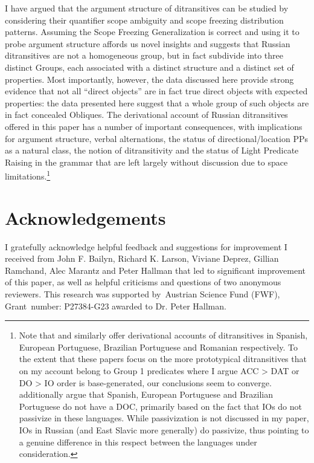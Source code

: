 \documentclass[output=paper,colorlinks,citecolor=brown,nonflat]{./langscibook}
\begin{document}
I have argued that the argument structure of ditransitives can be studied by considering their quantifier scope ambiguity and scope freezing distribution patterns. Assuming the Scope Freezing Generalization is correct and using it to probe argument structure affords us novel insights and suggests that Russian ditransitives are not a homogeneous group, but in fact subdivide into three distinct Groups, each associated with a distinct structure and a distinct set of properties. Most importantly, however, the data discussed here provide strong evidence that not all “direct objects” are in fact true direct objects with expected properties: the data presented here suggest that a whole group of such objects are in fact concealed Obliques. The derivational account of Russian ditransitives offered in this paper has a number of important consequences, with implications for argument structure, verbal alternations, the status of directional/location PPs as a natural class, the notion of ditransitivity and the status of Light Predicate Raising in the grammar that are left largely without discussion due to space limitations.\footnote{Note that  and  similarly offer derivational accounts of ditransitives in Spanish, European Portuguese, Brazilian Portuguese and Romanian respectively. To the extent that these papers focus on the more prototypical ditransitives that on my account belong to Group 1 predicates where I argue ACC > DAT or DO > IO order is base-generated, our conclusions seem to converge.  additionally argue that Spanish, European Portuguese and Brazilian Portuguese do not have a DOC, primarily based on the fact that IOs do not passivize in these languages. While passivization is not discussed in my paper, IOs in Russian (and East Slavic more generally) do passivize, thus pointing to a genuine difference in this respect between the languages under consideration.}

\section*{Acknowledgements}
I gratefully acknowledge helpful feedback and suggestions for improvement I received from John F. Bailyn, Richard K. Larson, Viviane Deprez, Gillian Ramchand, Alec Marantz and Peter Hallman that led to significant improvement of this paper, as well as helpful criticisms and questions of two anonymous reviewers. This research was supported by~Austrian Science Fund (FWF), Grant~number: P27384-G23 awarded to Dr. Peter Hallman.

\sloppy\printbibliography[heading=subbibliography,notkeyword=this]
\end{document}
